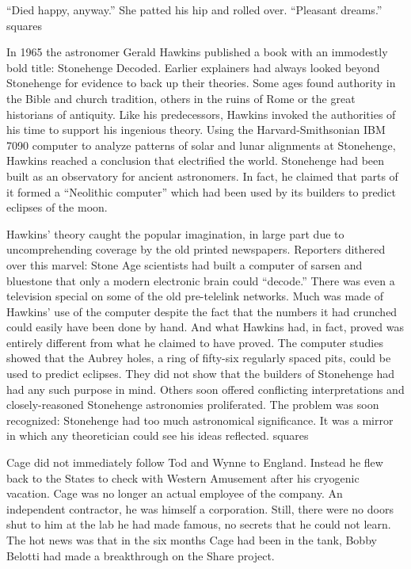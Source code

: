 “Died happy, anyway.” She patted his hip and rolled over. “Pleasant dreams.”
squares

In 1965 the astronomer Gerald Hawkins published a book with an immodestly bold title: Stonehenge Decoded. Earlier explainers had always looked beyond Stonehenge for evidence to back up their theories. Some ages found authority in the Bible and church tradition, others in the ruins of Rome or the great historians of antiquity. Like his predecessors, Hawkins invoked the authorities of his time to support his ingenious theory. Using the Harvard-Smithsonian IBM 7090 computer to analyze patterns of solar and lunar alignments at Stonehenge, Hawkins reached a conclusion that electrified the world. Stonehenge had been built as an observatory for ancient astronomers. In fact, he claimed that parts of it formed a “Neolithic computer” which had been used by its builders to predict eclipses of the moon.

Hawkins’ theory caught the popular imagination, in large part due to uncomprehending coverage by the old printed newspapers. Reporters dithered over this marvel: Stone Age scientists had built a computer of sarsen and bluestone that only a modern electronic brain could “decode.” There was even a television special on some of the old pre-telelink networks. Much was made of Hawkins’ use of the computer despite the fact that the numbers it had crunched could easily have been done by hand. And what Hawkins had, in fact, proved was entirely different from what he claimed to have proved. The computer studies showed that the Aubrey holes, a ring of fifty-six regularly spaced pits, could be used to predict eclipses. They did not show that the builders of Stonehenge had had any such purpose in mind. Others soon offered conflicting interpretations and closely-reasoned Stonehenge astronomies proliferated. The problem was soon recognized: Stonehenge had too much astronomical significance. It was a mirror in which any theoretician could see his ideas reflected.
squares

Cage did not immediately follow Tod and Wynne to England. Instead he flew back to the States to check with Western Amusement after his cryogenic vacation. Cage was no longer an actual employee of the company. An independent contractor, he was himself a corporation. Still, there were no doors shut to him at the lab he had made famous, no secrets that he could not learn. The hot news was that in the six months Cage had been in the tank, Bobby Belotti had made a breakthrough on the Share project.

